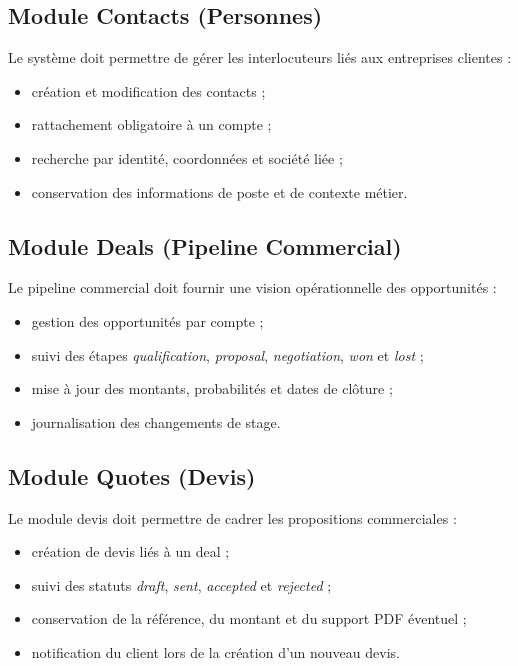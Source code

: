 \subsection{Module Contacts (Personnes)}
Le système doit permettre de gérer les interlocuteurs liés aux entreprises clientes :
\begin{itemize}
    \item création et modification des contacts ;
    \item rattachement obligatoire à un compte ;
    \item recherche par identité, coordonnées et société liée ;
    \item conservation des informations de poste et de contexte métier.
\end{itemize}

\subsection{Module Deals (Pipeline Commercial)}
Le pipeline commercial doit fournir une vision opérationnelle des opportunités :
\begin{itemize}
    \item gestion des opportunités par compte ;
    \item suivi des étapes \textit{qualification}, \textit{proposal}, \textit{negotiation}, \textit{won} et \textit{lost} ;
    \item mise à jour des montants, probabilités et dates de clôture ;
    \item journalisation des changements de stage.
\end{itemize}

\subsection{Module Quotes (Devis)}
Le module devis doit permettre de cadrer les propositions commerciales :
\begin{itemize}
    \item création de devis liés à un deal ;
    \item suivi des statuts \textit{draft}, \textit{sent}, \textit{accepted} et \textit{rejected} ;
    \item conservation de la référence, du montant et du support PDF éventuel ;
    \item notification du client lors de la création d'un nouveau devis.
\end{itemize}

